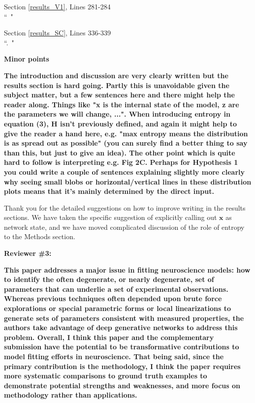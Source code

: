 \documentclass[11pt,a4paper]{article}
\begin{document}
\begin{displayquote}
Section \ref{results_V1}, Lines 281-284\\
``~"
\end{displayquote}

\begin{displayquote}
Section \ref{results_SC}, Lines 336-339\\
``.~"
\end{displayquote}
\textbf{Minor points }

\textbf{The introduction and discussion are very clearly written but the results section is hard going. Partly this is unavoidable given the subject matter, but a few sentences here and there might help the reader along. Things like "x is the internal state of the model, z are the parameters we will change, ...". When introducing entropy in equation (3), H isn't previously defined, and again it might help to give the reader a hand here, e.g. "max entropy means the distribution is as spread out as possible" (you can surely find a better thing to say than this, but just to give an idea). The other point which is quite hard to follow is interpreting e.g. Fig 2C. Perhaps for Hypothesis 1 you could write a couple of sentences explaining slightly more clearly why seeing small blobs or horizontal/vertical lines in these distribution plots means that it's mainly determined by the direct input. }

Thank you for the detailed suggestions on how to improve writing in the results sections.
 We have taken the specific suggestion of explicitly calling out $\mathbf{x}$ as network state, and we have moved complicated discussion of the role of entropy to the Methods section.

{\Large \textbf{Reviewer \#3:}}

\textbf{This paper addresses a major issue in fitting neuroscience models: how to identify the often degenerate, or nearly degenerate, set of parameters that can underlie a set of experimental observations. Whereas previous techniques often depended upon brute force explorations or special parametric forms or local linearizations to generate sets of parameters consistent with measured properties, the authors take advantage of deep generative networks to address this problem. Overall, I think this paper and the complementary submission have the potential to be transformative contributions to model fitting efforts in neuroscience. That being said, since the primary contribution is the methodology, I think the paper requires more systematic comparisons to ground truth examples to demonstrate potential strengths and weaknesses, and more focus on methodology rather than applications. }
\end{document}
